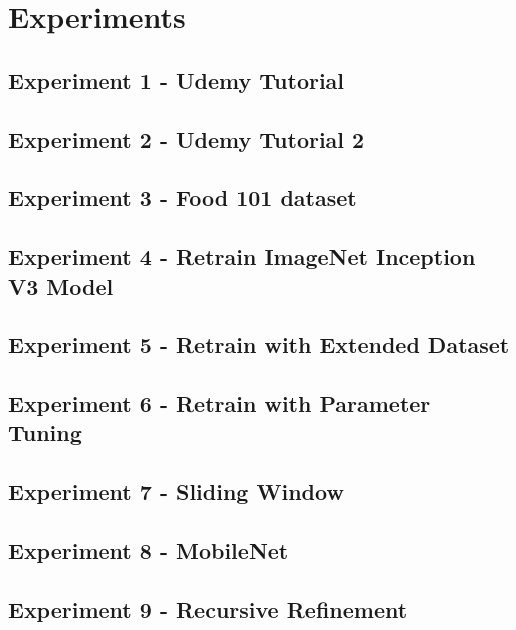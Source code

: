 \chapter{Experiments}
\label{exp}

\section{Experiment 1 - Udemy Tutorial}


\section{Experiment 2 - Udemy Tutorial 2}


\section{Experiment 3 - Food 101 dataset}


\section{Experiment 4 - Retrain ImageNet Inception V3 Model}


\section{Experiment 5 - Retrain with Extended Dataset}


\section{Experiment 6 - Retrain with Parameter Tuning}


\section{Experiment 7 - Sliding Window}


\section{Experiment 8 - MobileNet}


\section{Experiment 9 - Recursive Refinement}


